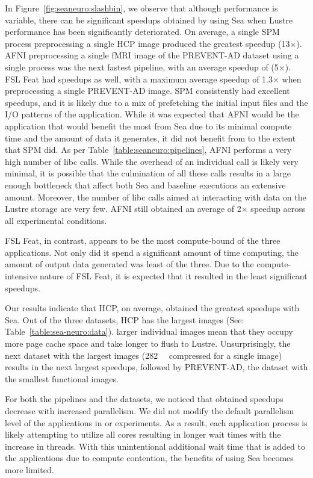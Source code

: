 In Figure~\ref{fig:seaneuro:slashbin}, we observe that although performance is
variable, there can be significant speedups obtained by using Sea when Lustre
performance has been significantly deteriorated. On average, a single SPM
process preprocessing a single HCP image produced the greatest speedup
(13$\times$). AFNI preprocessing a single fMRI image of the PREVENT-AD dataset
using a single process was the next fastest pipeline, with an average speedup of
(5$\times$). FSL Feat had speedups as well, with a maximum average speedup of
1.3$\times$ when preprocessing a single PREVENT-AD image. SPM consistently had
excellent speedups, and it is likely due to a mix of prefetching the initial
input files and the I/O patterns of the application. While it was expected that
AFNI would be the application that would benefit the most from Sea due to its
minimal compute time and the amount of data it generates, it did not benefit
from to the extent that SPM did. As per Table~\ref{table:seaneuro:pipelines},
AFNI performs a very high number of libc calls. While the overhead of an
individual call is likely very minimal, it is possible that the culmination of
all these calls results in a large enough bottleneck that affect both Sea and
baseline executions an extensive amount. Moreover, the number of libc calls
aimed at interacting with data on the Lustre storage are very few. AFNI still
obtained an average of 2$\times$ speedup across all experimental conditions.

FSL Feat, in contrast, appears to be the most compute-bound of the three
applications. Not only did it spend a significant amount of time computing, the
amount of output data generated was least of the three. Due to the
compute-intensive nature of FSL Feat, it is expected that it resulted in the
least significant speedups.

Our results indicate that HCP, on average, obtained the greatest speedups with
Sea. Out of the three datasets, HCP has the largest images (See:
Table~\ref{table:sea-neuro:data}). larger individual images mean that they
occupy more page cache space and take longer to flush to Lustre. Unsurprisingly,
the next dataset with the largest images (\SI{282}{\mebi\byte} compressed for a
single image) results in the next largest speedups, followed by PREVENT-AD, the
dataset with the smallest functional images.

For both the pipelines and the datasets, we noticed that obtained speedups
decrease with increased parallelism. We did not modify the default parallelism
level of the applications in or experiments. As a result, each application
process is likely attempting to utilize all cores resulting in longer wait times
with the increase in threads. With this unintentional additional wait time that
is added to the applications due to compute contention, the benefits of using
Sea becomes more limited.


